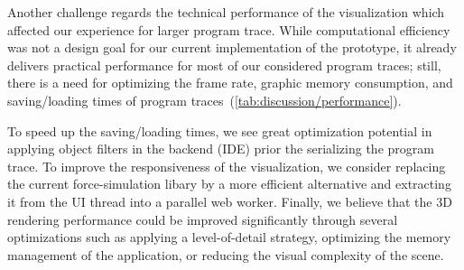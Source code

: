 Another challenge regards the technical performance of the visualization which affected our experience for larger program trace.
While computational efficiency was not a design goal for our current implementation of the \tfd{} prototype, it already delivers practical performance for most of our considered program traces; still, there is a need for optimizing the frame rate, graphic memory consumption, and saving/loading times of program traces~(\cref{tab:discussion/performance}).

To speed up the saving/loading times, we see great optimization potential in applying object filters in the backend (IDE) prior the serializing the program trace.
To improve the responsiveness of the visualization, we consider replacing the current force-simulation libary  by a more efficient alternative and extracting it from the UI thread into a parallel web worker.
Finally, we believe that the 3D rendering performance could be improved significantly through several optimizations such as applying a level-of-detail strategy, optimizing the memory management of the application, or reducing the visual complexity of the scene.
